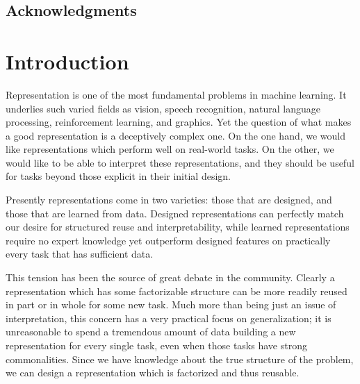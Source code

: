 \documentclass[12pt,twoside]{mitthesis}
\begin{document}
\cleardoublepage



\section*{Acknowledgments}

%



    {
    \setcounter{tocdepth}{2}
    \tableofcontents
    }
    \listoffigures
% 

\chapter{Introduction}\label{introduction}

Representation is one of the most fundamental problems in machine
learning. It underlies such varied fields as vision, speech recognition,
natural language processing, reinforcement learning, and graphics. Yet
the question of what makes a good representation is a deceptively
complex one. On the one hand, we would like representations which
perform well on real-world tasks. On the other, we would like to be able
to interpret these representations, and they should be useful for tasks
beyond those explicit in their initial design.

Presently representations come in two varieties: those that are
designed, and those that are learned from data. Designed representations
can perfectly match our desire for structured reuse and
interpretability, while learned representations require no expert
knowledge yet outperform designed features on practically every task
that has sufficient data.

This tension has been the source of great debate in the community.
Clearly a representation which has some factorizable structure can be
more readily reused in part or in whole for some new task. Much more
than being just an issue of interpretation, this concern has a very
practical focus on generalization; it is unreasonable to spend a
tremendous amount of data building a new representation for every single
task, even when those tasks have strong commonalities. Since we have
knowledge about the true structure of the problem, we can design a
representation which is factorized and thus reusable.
\end{document}
